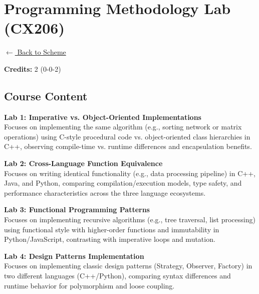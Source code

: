 \section*{Programming Methodology Lab (CX206)}
\label{course:CX206}

\noindent \small{\hyperref[main:scheme]{$\leftarrow$ Back to Scheme}} \vspace{0.5cm}

\noindent \textbf{Credits:} 2 (0-0-2)

\subsection*{Course Content}
\noindent\textbf{Lab 1: Imperative vs. Object-Oriented Implementations} \\
Focuses on implementing the same algorithm (e.g., sorting network or matrix operations) using C-style procedural code vs. object-oriented class hierarchies in C++, observing compile-time vs. runtime differences and encapsulation benefits. \\

\vspace{0.2cm}

\noindent\textbf{Lab 2: Cross-Language Function Equivalence} \\
Focuses on writing identical functionality (e.g., data processing pipeline) in C++, Java, and Python, comparing compilation/execution models, type safety, and performance characteristics across the three language ecosystems. \\

\vspace{0.2cm}

\noindent\textbf{Lab 3: Functional Programming Patterns} \\
Focuses on implementing recursive algorithms (e.g., tree traversal, list processing) using functional style with higher-order functions and immutability in Python/JavaScript, contrasting with imperative loops and mutation. \\

\vspace{0.2cm}

\noindent\textbf{Lab 4: Design Patterns Implementation} \\
Focuses on implementing classic design patterns (Strategy, Observer, Factory) in two different languages (C++/Python), comparing syntax differences and runtime behavior for polymorphism and loose coupling. \\

